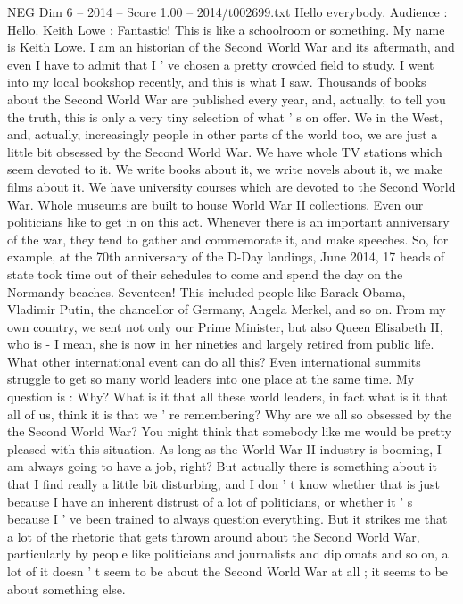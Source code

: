 \begin{textsample}{NEG Dim 6 – 2014 – Score 1.00 – 2014/t002699.txt}  \label{ex:f6_neg_030}
Hello everybody.
Audience : Hello.
Keith Lowe : Fantastic!
This is like a schoolroom or something.
My name is Keith Lowe.
I am an historian of the Second World War and its aftermath, and even I have to admit that I ' ve chosen a pretty crowded field to study.
I went into my local bookshop recently, and this is what I saw.
Thousands of books about the Second World War are published every year, and, actually, to tell you the truth, this is only a very tiny selection of what ' s on offer.
We in the West, and, actually, increasingly people in other parts of the world too, we are just a little bit obsessed by the Second World War.
We have whole TV stations which seem devoted to it.
We write books about it, we write novels about it, we make films about it.
We have university courses which are devoted to the Second World War.
Whole museums are built to house World War II collections.
Even our politicians like to get in on this act.
Whenever there is an important anniversary of the war, they tend to gather and commemorate it, and make speeches.
So, for example, at the 70th anniversary of the D-Day landings, June 2014, 17 heads of state took time out of their schedules to come and spend the day on the Normandy beaches.
Seventeen!
This included people like Barack Obama, Vladimir Putin, the chancellor of Germany, Angela Merkel, and so on.
From my own country, we sent not only our Prime Minister, but also Queen Elisabeth II, who is - I mean, she is now in her nineties and largely retired from public life.
What other international event can do all this?
Even international summits struggle to get so many world leaders into one place at the same time.
My question is : Why?
What is it that all these world leaders, in fact what is it that all of us, think it is that we ' re remembering?
Why are we all so obsessed by the the Second World War?
You might think that somebody like me would be pretty pleased with this situation.
As long as the World War II industry is booming, I am always going to have a job, right?
But actually there is something about it that I find really a little bit disturbing, and I don ' t know whether that is just because I have an inherent distrust of a lot of politicians, or whether it ' s because I ' ve been trained to always question everything.
But it strikes me that a lot of the rhetoric that gets thrown around about the Second World War, particularly by people like politicians and journalists and diplomats and so on, a lot of it doesn ' t seem to be about the Second World War at all ; it seems to be about something else.

\end{textsample}
